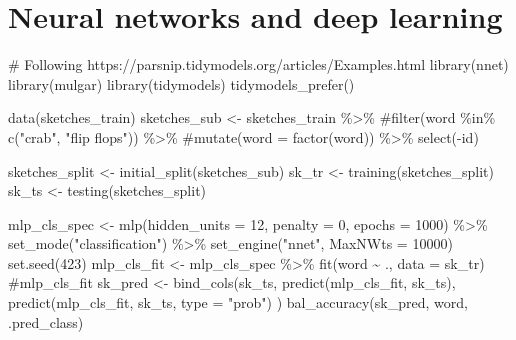 \documentclass[
  letterpaper,
]{book}
\newenvironment{Shaded}{\begin{snugshade}}{\end{snugshade}}
\newcommand{\AttributeTok}[1]{\textcolor[rgb]{0.40,0.45,0.13}{#1}}
\newcommand{\CommentTok}[1]{\textcolor[rgb]{0.37,0.37,0.37}{#1}}
\newcommand{\DecValTok}[1]{\textcolor[rgb]{0.68,0.00,0.00}{#1}}
\newcommand{\FunctionTok}[1]{\textcolor[rgb]{0.28,0.35,0.67}{#1}}
\newcommand{\NormalTok}[1]{\textcolor[rgb]{0.00,0.23,0.31}{#1}}
\newcommand{\OtherTok}[1]{\textcolor[rgb]{0.00,0.23,0.31}{#1}}
\newcommand{\SpecialCharTok}[1]{\textcolor[rgb]{0.37,0.37,0.37}{#1}}
\newcommand{\StringTok}[1]{\textcolor[rgb]{0.13,0.47,0.30}{#1}}
\begin{document}
\hypertarget{neural-networks-and-deep-learning}{%
\chapter{Neural networks and deep
learning}\label{neural-networks-and-deep-learning}}


\begin{Shaded}
\begin{Highlighting}[]
\CommentTok{\# Following https://parsnip.tidymodels.org/articles/Examples.html}
\FunctionTok{library}\NormalTok{(nnet)}
\FunctionTok{library}\NormalTok{(mulgar)}
\FunctionTok{library}\NormalTok{(tidymodels)}
\FunctionTok{tidymodels\_prefer}\NormalTok{()}

\FunctionTok{data}\NormalTok{(sketches\_train)}
\NormalTok{sketches\_sub }\OtherTok{\textless{}{-}}\NormalTok{ sketches\_train }\SpecialCharTok{\%\textgreater{}\%}
  \CommentTok{\#filter(word \%in\% c("crab", "flip flops")) \%\textgreater{}\%}
  \CommentTok{\#mutate(word = factor(word)) \%\textgreater{}\% }
  \FunctionTok{select}\NormalTok{(}\SpecialCharTok{{-}}\NormalTok{id)}

\NormalTok{sketches\_split }\OtherTok{\textless{}{-}} \FunctionTok{initial\_split}\NormalTok{(sketches\_sub)}
\NormalTok{sk\_tr }\OtherTok{\textless{}{-}} \FunctionTok{training}\NormalTok{(sketches\_split)}
\NormalTok{sk\_ts }\OtherTok{\textless{}{-}} \FunctionTok{testing}\NormalTok{(sketches\_split)}

\NormalTok{mlp\_cls\_spec }\OtherTok{\textless{}{-}} 
    \FunctionTok{mlp}\NormalTok{(}\AttributeTok{hidden\_units =} \DecValTok{12}\NormalTok{, }
        \AttributeTok{penalty =} \DecValTok{0}\NormalTok{, }
        \AttributeTok{epochs =} \DecValTok{1000}\NormalTok{) }\SpecialCharTok{\%\textgreater{}\%} 
    \FunctionTok{set\_mode}\NormalTok{(}\StringTok{"classification"}\NormalTok{) }\SpecialCharTok{\%\textgreater{}\%} 
    \FunctionTok{set\_engine}\NormalTok{(}\StringTok{"nnet"}\NormalTok{, }\AttributeTok{MaxNWts =} \DecValTok{10000}\NormalTok{)}
\FunctionTok{set.seed}\NormalTok{(}\DecValTok{423}\NormalTok{)}
\NormalTok{mlp\_cls\_fit }\OtherTok{\textless{}{-}}\NormalTok{ mlp\_cls\_spec }\SpecialCharTok{\%\textgreater{}\%} 
    \FunctionTok{fit}\NormalTok{(word }\SpecialCharTok{\textasciitilde{}}\NormalTok{ ., }\AttributeTok{data =}\NormalTok{ sk\_tr)}
\CommentTok{\#mlp\_cls\_fit}
\NormalTok{sk\_pred }\OtherTok{\textless{}{-}} \FunctionTok{bind\_cols}\NormalTok{(sk\_ts,}
    \FunctionTok{predict}\NormalTok{(mlp\_cls\_fit, sk\_ts),}
    \FunctionTok{predict}\NormalTok{(mlp\_cls\_fit, sk\_ts, }\AttributeTok{type =} \StringTok{"prob"}\NormalTok{)}
\NormalTok{  )}
\FunctionTok{bal\_accuracy}\NormalTok{(sk\_pred, word, .pred\_class)}


\end{Highlighting}
\end{Shaded}
\end{document}
